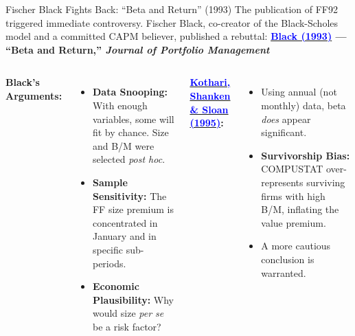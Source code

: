 \documentclass{beamer}
\begin{document}
\begin{frame}{Fischer Black Fights Back: ``Beta and Return'' (1993)}
	The publication of FF92 triggered immediate controversy. Fischer Black, co-creator of the Black-Scholes model and a committed CAPM believer, published a rebuttal:
	\vspace{4pt}
	\textbf{\href{https://doi.org/10.3905/jpm.1993.409462}{\textcolor{blue}{Black (1993)}} --- ``Beta and Return,'' \textit{Journal of Portfolio Management}}
	\vspace{4pt}
	\begin{columns}
		\textbf{Black's Arguments:}
		\begin{itemize}
			\item \textbf{Data Snooping:} With enough variables, some will fit by chance. Size and B/M were selected \textit{post hoc}.
			\item \textbf{Sample Sensitivity:} The FF size premium is concentrated in January and in specific sub-periods.
			\item \textbf{Economic Plausibility:} Why would size \textit{per se} be a risk factor?
		\end{itemize}
		\textbf{\href{https://doi.org/10.1111/j.1540-6261.1995.tb05184.x}{\textcolor{blue}{Kothari, Shanken \& Sloan (1995)}}:}
		\begin{itemize}
			\item Using annual (not monthly) data, beta \textit{does} appear significant.
			\item \textbf{Survivorship Bias:} COMPUSTAT over-represents surviving firms with high B/M, inflating the value premium.
			\item A more cautious conclusion is warranted.
		\end{itemize}
	\end{columns}
\end{frame}
\end{document}
